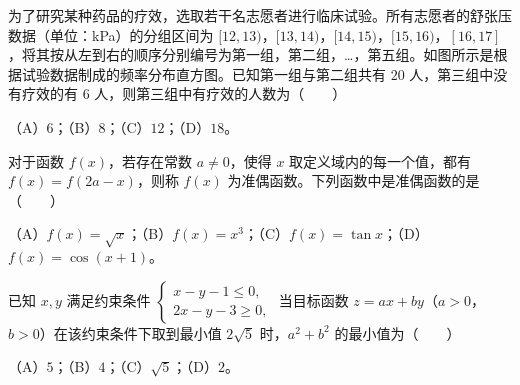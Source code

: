 \begin{question}
为了研究某种药品的疗效，选取若干名志愿者进行临床试验。所有志愿者的舒张压数据（单位：kPa）的分组区间为 $[12,13)$，$[13,14)$，$[14,15)$，$[15,16)$，$[16,17]$，将其按从左到右的顺序分别编号为第一组，第二组，…，第五组。如图所示是根据试验数据制成的频率分布直方图。已知第一组与第二组共有 $20$ 人，第三组中没有疗效的有 $6$ 人，则第三组中有疗效的人数为\mbox{（　　）}

（A）$6$；（B）$8$；（C）$12$；（D）$18$。
\nopagebreak[4]
\begin{center}\end{center}
\nopagebreak[4]
\end{question}
\begin{question}
对于函数 $f(x)$，若存在常数 $a\neq0$，使得 $x$ 取定义域内的每一个值，都有 $f(x)=f(2a-x)$，则称 $f(x)$ 为准偶函数。下列函数中是准偶函数的是\mbox{（　　）}

（A）$f(x)=\sqrt x$；（B）$f(x)=x^3$；（C）$f(x)=\tan x$；（D）$f(x)=\cos(x+1)$。

\end{question}
\begin{question}
已知 $x,y$ 满足约束条件 $\begin{cases}x-y-1\leqslant0,\\2x-y-3\geqslant0,\end{cases}$ 当目标函数 $z=ax+by$（$a>0$，$b>0$）在该约束条件下取到最小值 $2\sqrt5$ 时，$a^2+b^2$ 的最小值为\mbox{（　　）}

（A）$5$；（B）$4$；（C）$\sqrt5$；（D）$2$。

\end{question}


